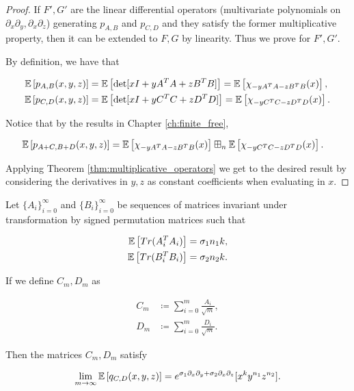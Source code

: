    \begin{proof}
        If $F',G'$ are the linear differential operators (multivariate polynomials on $\partial_x\partial_y, \partial_x\partial_z$) generating $p_{A,B}$ and $p_{C,D}$ and they satisfy the former multiplicative property, then it can be extended to $F,G$ by linearity. Thus we prove for $F', G'$. 


        By definition, we have that 
        
        \begin{align*}
            \mathbb E \left[  p_{A, B}(x,y,z)  \right] &= \mathbb E \left[  \det[ x I + y A^T A + z B^TB ]  \right] = \mathbb E \left[ \chi_{-yA^TA -zB^TB}(x) \right],\\
            \mathbb E \left[  p_{C, D}(x,y,z)  \right] &= \mathbb E \left[  \det[ x I + y C^TC + z D^TD ]  \right] = \mathbb E \left[ \chi_{-yC^TC -zD^TD}(x) \right].
        \end{align*}

        Notice that by the results in Chapter \ref{ch:finite_free},

        \begin{align*}
            \mathbb E \left[ p_{A+C, B+D}(x,y,z) \right] &= \mathbb E \left[ \chi_{-yA^TA -zB^TB}(x) \right] \boxplus_n \mathbb E \left[ \chi_{-yC^TC -zD^TD}(x) \right].
        \end{align*}

        Applying Theorem \ref{thm:multiplicative_operators} we get to the desired result by considering the derivatives in $y,z$ as constant coefficients when evaluating in $x$.

    \end{proof}

    \begin{theorem} \label{thm:exp_operator}
        Let $\{A_i\}_{i=0}^\infty$ and $\{B_i\}_{i=0}^\infty$ be sequences of matrices invariant under transformation by signed permutation matrices such that

        \begin{align*}
            \mathbb E \left[ Tr(A^T_iA_i) \right] &= \sigma_1 n_1 k,\\
            \mathbb E \left[ Tr(B^T_iB_i) \right] &= \sigma_2 n_2 k.
        \end{align*}

        If we define $C_m, D_m$ as

        \begin{align*}
            C_m &\coloneqq \sum_{i=0}^m \frac{A_i}{\sqrt m}, \\
            D_m &\coloneqq \sum_{i=0}^m \frac{D_i}{\sqrt m}.
        \end{align*}

        Then the matrices $C_m, D_m$ satisfy

        \begin{equation*}
            \lim_{m\to\infty} \mathbb E \left[ q_{C,D}(x,y,z) \right] = e^{\sigma_1 \partial_x \partial_y + \sigma_2 \partial_x \partial_z}[x^k y^{n_1} z^{n_2}].
        \end{equation*}
    \end{theorem}

